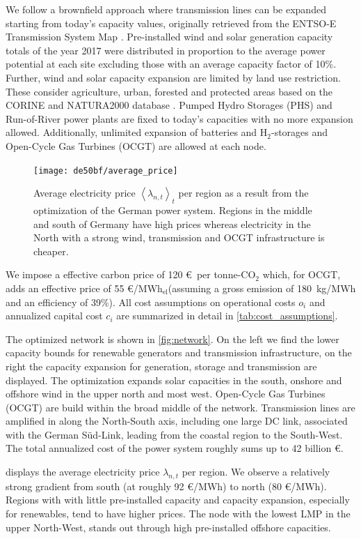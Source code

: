 \documentclass[11pt,twocolumn]{article}
\newcommand{\lmp}[1][n]{\lambda_{#1,t}}
\newcommand{\averagelmp}{\left<\lmp\right>_t}
\newcommand{\megawatthour}{MWh$_\text{el}$}
\begin{document}
We follow a brownfield approach where transmission lines can be expanded starting from today's capacity values, originally retrieved from the ENTSO-E Transmission System Map \cite{entso-e_entso-e_nodate}. Pre-installed wind and solar generation capacity totals of the year 2017 were distributed in proportion to the average power potential at each site excluding those with an average capacity factor of 10\%. Further, wind and solar capacity expansion are limited by land use restriction. These consider agriculture, urban, forested and protected areas based on the CORINE and NATURA2000 database \cite{corine2012,natura2000}. Pumped Hydro Storages (PHS) and Run-of-River power plants are fixed to today's capacities with no more expansion allowed. Additionally, unlimited expansion of batteries and H$_{2}$-storages and Open-Cycle Gas Turbines (OCGT) are allowed at each node. 
% 
% 
\begin{figure}
    \centering
    \texttt{[image: de50bf/average\_price]}
    \caption{Average electricity price $\averagelmp$ per region as a result from the optimization of the German power system. Regions in the middle and south of Germany have high prices whereas electricity in the North with a strong wind, transmission and OCGT infrastructure is cheaper.}
    \label{fig:average_price}
\end{figure}
We impose a effective carbon price of 120 \euro\, per tonne-CO$_{2}$ which, for OCGT, adds an effective price of 55 \euro/\megawatthour (assuming a gross emission of 180~kg/MWh and an efficiency of 39\%). All cost assumptions on operational costs $o_i$ and annualized capital cost $c_i$ are summarized in detail in \cref{tab:cost_assumptions}. 

The optimized network is shown in  \cref{fig:network}. On the left we find the lower capacity bounds for renewable generators and transmission infrastructure, on the right the capacity expansion for generation, storage and transmission are displayed. The optimization expands solar capacities in the south, onshore and offshore wind in the upper north and most west. Open-Cycle Gas Turbines (OCGT) are build within the broad middle of the network. Transmission lines are amplified in along the North-South axis, including one large DC link, associated with the German S\"ud-Link, leading from the coastal region to the South-West. 
The total annualized cost of the power system roughly sums up to 42 billion \euro.
% 

 displays the average electricity price $\lmp$ per region. We observe a relatively strong gradient from south (at roughly 92 \euro/MWh) to north (80 \euro/MWh). Regions with with little pre-installed capacity and capacity expansion, especially for renewables, tend to have higher prices. The node with the lowest LMP in the upper North-West, stands out through high pre-installed offshore capacities. \\
 
\end{document}
